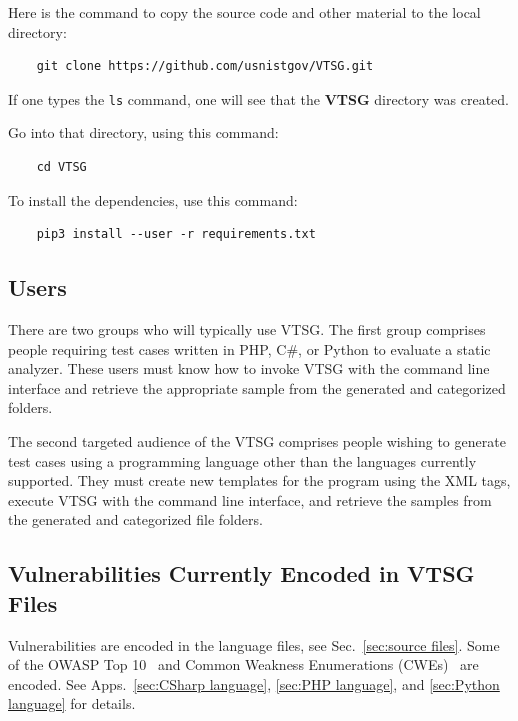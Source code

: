 \documentclass[12pt]{article}
\newcommand{\CSharp}{C{\fontseries{b}\selectfont\#}}
\begin{document}
\noindent Here is the command to copy the source code and other material to the local
directory:

\begin{verbatim}
    git clone https://github.com/usnistgov/VTSG.git
\end{verbatim}

\noindent If one types the \verb|ls| command, one will see that the \textbf{VTSG}
directory was created.

\noindent Go into that directory, using this command:

\begin{verbatim}
    cd VTSG
\end{verbatim}

\noindent To install the dependencies, use this command:

\begin{verbatim}
    pip3 install --user -r requirements.txt
\end{verbatim}


\subsection{Users}

There are two groups who will typically use VTSG. The first group comprises people
requiring test cases written in PHP, \CSharp, or Python to evaluate a static
analyzer. These users must know how to invoke VTSG with the command line interface
and retrieve the appropriate sample from the generated and categorized folders.

The second targeted audience of the VTSG comprises people wishing to generate
test cases using a programming language other than the languages currently
supported.  They must create new templates for the program
using the XML tags, execute VTSG with the command line interface,
and retrieve the samples from the generated and categorized file folders.

\subsection{Vulnerabilities Currently Encoded in VTSG Files}

Vulnerabilities are encoded in the language files, see Sec.~\ref{sec:source files}.
Some of the OWASP Top 10~\cite{OWASPTop10-2017} and
Common Weakness Enumerations (CWEs)~\cite{CWE} are encoded.
See Apps.~\ref{sec:CSharp language}, \ref{sec:PHP language}, and
\ref{sec:Python language} for details.
\end{document}
